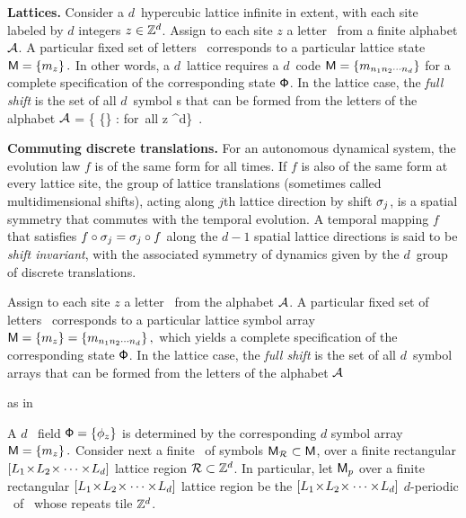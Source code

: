 {\bf Lattices.}
Consider a $d$\dmn\ hypercubic lattice infinite in extent, with each site
labeled by $d$ integers $z\in \mathbb{Z}^{d}$. Assign to each site $z$ a
letter \ from a finite alphabet $\mathcal{A}$. A particular fixed set
of letters  \ corresponds to a particular lattice state
\(
\Mm= \{\Ssym{z}\} %
\,.
\)
In other words, a $d$\dmn\ lattice requires a {$d$\dmn\ code}
\(
\mathsf{M} = \{m_{n_1 n_2 \cdots n_d}\}
\)
for a complete specification of the corresponding state $\mathsf{\Phi}$.
In the lattice case, the {\em full shift} is the set of all $d$\dmn\
symbol \brick s that can be formed from the letters of the alphabet $\mathcal{A}$
\beq
\hat{\AdmItnr} = \{ \{\} %
              : \Ssym{z} \in \A \quad \mbox{for all} \quad z \in  \integers^d\}
\,.

{\bf Commuting discrete translations.}
For an autonomous dynamical system, the evolution law $f$ is of the same form for
all times. If $f$ is also of the same form at every lattice site, the group of
lattice translations (sometimes called multidimensional shifts), acting along
$j$th lattice direction by shift $\sigma_{j}$, is a spatial symmetry that commutes
with the temporal evolution. A temporal mapping $f$ that satisfies
$f\circ\sigma_{j}=\sigma_{j}\circ{f}$ along the $d\!-\!1$ spatial lattice directions
is said to be {\em shift invariant}, with the associated symmetry of dynamics
given by the $d$\dmn\ group of discrete {\spt} translations.

\bigskip

Assign to each site $z$ a
letter \ from the alphabet $\mathcal{A}$. A particular fixed set
of letters  \Ssym{z}\ corresponds to a particular lattice symbol array
\(
\Mm= \{\Ssym{z}\} %
 = \{\Ssym{n_1 n_2 \cdots n_d}\}
\,,
\)
which yields a complete specification of the corresponding state $\mathsf{\Phi}$.
In the lattice case, the {\em full shift} is the set of all $d$\dmn\
symbol arrays that can be formed from the letters of the alphabet $\mathcal{A}$

as in \refeq{LatticeFullSh}

A $d$\dmn\ {\spt} field
\(
\mathsf{\Phi}=\{\phi_{z}\}
\)
is determined by the corresponding {\em $d$\dmn} {\spt}
symbol array
\(
\mathsf{M}=\{{m_{z}}\}
\,.
\)
Consider next a finite \brick\ of symbols $\mathsf{M}_{\mathcal{R}}\subset\mathsf{M}$,
over a finite rectangular $[{L_{1}}\!\times\!{L_{2}}\!\times\cdots\times\!{L_{d}}]$
lattice region $\mathcal{R}\subset \mathbb{Z}^d$.
In particular, let $\mathsf{M}_{p}$ over a finite rectangular
$[{L_{1}}\!\times\!{L_{2}}\!\times\cdots\times\!{L_{d}}]$ lattice region be the
$[{L_{1}}\!\times\!{L_{2}}\!\times\cdots\times\!{L_{d}}]$ $d$-periodic \brick\ of
\Mm\ whose repeats tile $\mathbb{Z}^d$.

